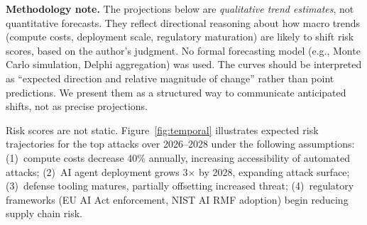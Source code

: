 \documentclass[conference]{IEEEtran}
\begin{document}
\textbf{Methodology note.} The projections below are \emph{qualitative trend estimates}, not quantitative forecasts. They reflect directional reasoning about how macro trends (compute costs, deployment scale, regulatory maturation) are likely to shift risk scores, based on the author's judgment. No formal forecasting model (e.g., Monte Carlo simulation, Delphi aggregation) was used. The curves should be interpreted as ``expected direction and relative magnitude of change'' rather than point predictions. We present them as a structured way to communicate anticipated shifts, not as precise projections.

Risk scores are not static. Figure~\ref{fig:temporal} illustrates expected risk trajectories for the top attacks over 2026--2028 under the following assumptions: (1)~compute costs decrease 40\% annually, increasing accessibility of automated attacks; (2)~AI agent deployment grows 3$\times$ by 2028, expanding attack surface; (3)~defense tooling matures, partially offsetting increased threat; (4)~regulatory frameworks (EU AI Act enforcement, NIST AI RMF adoption) begin reducing supply chain risk.
\end{document}
